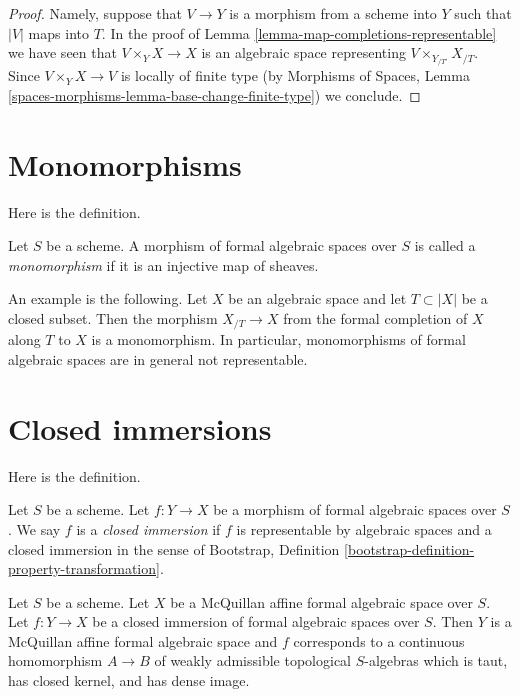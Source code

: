 \begin{proof}
Namely, suppose that $V \to Y$ is a morphism from a scheme into $Y$ such
that $|V|$ maps into $T$. In the proof of
Lemma \ref{lemma-map-completions-representable}
we have seen that $V \times_Y X \to X$ is an algebraic space
representing $V \times_{Y_{/T'}} X_{/T}$.
Since $V \times_Y X \to V$ is locally of finite type
(by Morphisms of Spaces, Lemma
\ref{spaces-morphisms-lemma-base-change-finite-type}) we conclude.
\end{proof}





\section{Monomorphisms}
\label{section-monomorphisms}

\noindent
Here is the definition.

\begin{definition}
\label{definition-monomorphism}
Let $S$ be a scheme.
A morphism of formal algebraic spaces over $S$ is called a
{\it monomorphism} if it is an injective map of sheaves.
\end{definition}

\noindent
An example is the following. Let $X$ be an algebraic space and let
$T \subset |X|$ be a closed subset. Then the morphism
$X_{/T} \to X$ from the formal completion of $X$ along $T$ to $X$
is a monomorphism. In particular, monomorphisms of formal algebraic
spaces are in general not representable.



\section{Closed immersions}
\label{section-closed-immersions}

\noindent
Here is the definition.

\begin{definition}
\label{definition-closed-immersion}
Let $S$ be a scheme. Let $f : Y \to X$ be a morphism of formal algebraic
spaces over $S$. We say $f$ is a {\it closed immersion}
if $f$ is representable by algebraic spaces and a closed immersion
in the sense of
Bootstrap, Definition \ref{bootstrap-definition-property-transformation}.
\end{definition}

\begin{lemma}
\label{lemma-closed-immersion-into-McQuillan}
Let $S$ be a scheme. Let $X$ be a McQuillan affine formal algebraic space
over $S$. Let $f : Y \to X$ be a closed immersion of formal algebraic spaces
over $S$. Then $Y$ is a McQuillan affine formal algebraic space and
$f$ corresponds to a continuous homomorphism $A \to B$ of weakly admissible
topological $S$-algebras which is taut, has closed kernel, and has
dense image.
\end{lemma}

